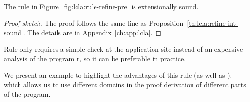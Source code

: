 \begin{prop}\label{th:lcla:refine-pre-sound}
	The rule  in Figure~\ref{fig:lcla:rule-refine-pre} is extensionally sound.
\end{prop}
\begin{proof}[Proof sketch]
	The proof follows the same line as Proposition~\ref{th:lcla:refine-int-sound}. The details are in Appendix~\ref{ch:app:lcla}.
\end{proof}

Rule  only requires a simple check at the application site instead of an expensive analysis of the program $\mathsf{r}$, so it can be preferable in practice.

We present an example to highlight the advantages of this rule (as well as ), which allows us to use different domains in the proof derivation of different parts of the program.

